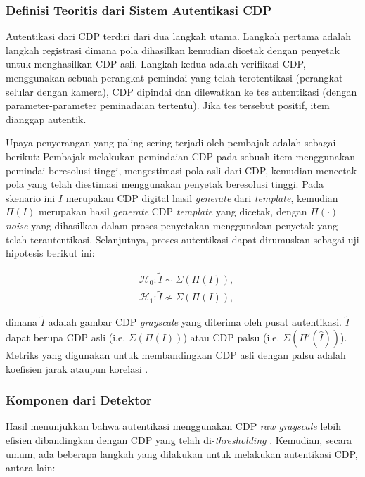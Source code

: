 \subsubsection{Definisi Teoritis dari Sistem Autentikasi CDP}
Autentikasi dari CDP terdiri dari dua langkah utama. Langkah pertama adalah langkah registrasi dimana pola dihasilkan kemudian dicetak dengan penyetak untuk menghasilkan CDP asli. Langkah kedua adalah verifikasi CDP, menggunakan sebuah perangkat pemindai yang telah terotentikasi (perangkat selular dengan kamera), CDP dipindai dan dilewatkan ke tes autentikasi (dengan parameter-parameter peminadaian tertentu). Jika tes tersebut positif, item dianggap autentik.

Upaya penyerangan yang paling sering terjadi oleh pembajak adalah sebagai berikut: Pembajak melakukan pemindaian CDP pada sebuah item menggunakan pemindai beresolusi tinggi, mengestimasi pola asli dari CDP, kemudian mencetak pola yang telah diestimasi menggunakan penyetak beresolusi tinggi. Pada skenario ini $I$ merupakan CDP digital hasil \emph{generate} dari \emph{template}, kemudian $\Pi(I)$ merupakan hasil \emph{generate} CDP \emph{template} yang dicetak, dengan $\Pi(\cdot)$ \emph{noise} yang dihasilkan dalam proses penyetakan menggunakan penyetak yang telah terautentikasi. Selanjutnya, proses autentikasi dapat dirumuskan sebagai uji hipotesis berikut ini:

\begin{align}
	&\mathcal{H}_{0}:\tilde{I}\sim\Sigma(\Pi(I)),\\ &\mathcal{H}_{1}:\tilde{I}\not\sim\Sigma(\Pi(I)),\nonumber
\end{align}

dimana $\widetilde{I}$ adalah gambar CDP \emph{grayscale} yang diterima oleh pusat autentikasi. $\widetilde{I}$ dapat berupa CDP asli (i.e. $\Sigma(\Pi(I))$) atau CDP palsu (i.e. $\Sigma(\Pi'(\hat{I}))$). Metriks yang digunakan untuk membandingkan CDP asli dengan palsu adalah koefisien jarak ataupun korelasi \cite{dirik2012copy}.

\subsubsection{Komponen dari Detektor}
Hasil menunjukkan bahwa autentikasi menggunakan CDP \emph{raw grayscale} lebih efisien dibandingkan dengan CDP yang telah di-\emph{thresholding} \cite{phan2014document}. Kemudian, secara umum, ada beberapa langkah yang dilakukan untuk melakukan autentikasi CDP, antara lain:

